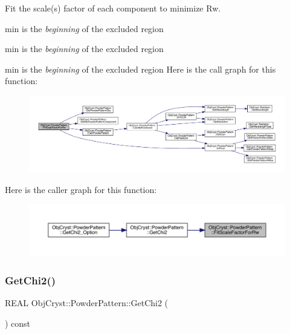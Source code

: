 Fit the scale(s) factor of each component to minimize Rw. 

min is the {\itshape beginning} of the excluded region

min is the {\itshape beginning} of the excluded region

min is the {\itshape beginning} of the excluded region Here is the call graph for this function\+:
\nopagebreak
\begin{figure}[H]
\begin{center}
\leavevmode
\includegraphics[width=350pt]{class_obj_cryst_1_1_powder_pattern_ab9b4d9f2af1885625fb27c6b1ab7519d_cgraph}
\end{center}
\end{figure}
Here is the caller graph for this function\+:
\nopagebreak
\begin{figure}[H]
\begin{center}
\leavevmode
\includegraphics[width=350pt]{class_obj_cryst_1_1_powder_pattern_ab9b4d9f2af1885625fb27c6b1ab7519d_icgraph}
\end{center}
\end{figure}
\mbox{\label{class_obj_cryst_1_1_powder_pattern_ab9fae16effd2ca4b59bf40e0706b86f2}} 
\subsubsection{\texorpdfstring{GetChi2()}{GetChi2()}}
{\footnotesize\ttfamily R\+E\+AL Obj\+Cryst\+::\+Powder\+Pattern\+::\+Get\+Chi2 (\begin{DoxyParamCaption}{ }\end{DoxyParamCaption}) const}



